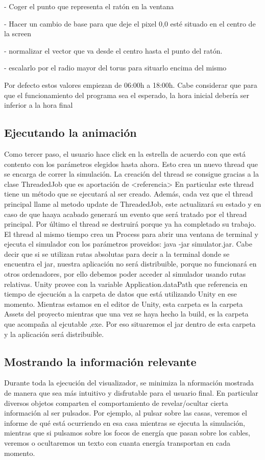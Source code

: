 \documentclass[12pt,a4paper,openright,oneside]{article}
\numberwithin{equation}{section}
\theoremstyle{definition}
\begin{document}
- Coger el punto que representa el ratón en la ventana

- Hacer un cambio de base para que deje el pixel 0,0 esté situado en el centro de la screen

- normalizar el vector que va desde el centro hasta el punto del ratón.

- escalarlo por el radio mayor del torus para situarlo encima del mismo

Por defecto estos valores empiezan de 06:00h a 18:00h. Cabe considerar que para que el funcionamiento del programa sea el esperado, la hora inicial debería ser inferior a la hora final


\subsection{Ejecutando la animación} 
Como tercer paso, el usuario hace click en la estrella de acuerdo con que está contento con los parámetros elegidos hasta ahora. Esto crea un nuevo thread que se encarga de correr la simulación. La creación del thread se consigue gracias a la clase ThreadedJob que es aportación de <referencia> En particular este thread tiene un método que se ejecutará al ser creado. Además, cada vez que el thread principal llame al metodo update de ThreadedJob, este actualizará su estado y en caso de que haaya acabado generará un evento que será tratado por el thread principal. Por último el thread se destruirá porque ya ha completado su trabajo.
El thread al mismo tiempo crea un Process para abrir una ventana de terminal y ejecuta el simulador con los parámetros proveidos: java -jar simulator.jar. Cabe decir que si se utilizan rutas absolutas para decir a la terminal donde se encuentra el jar, nuestra aplicación no será distribuible, porque no funcionará en otros ordenadores, por ello debemos poder acceder al simulador usando rutas relativas. Unity provee con la variable Application.dataPath que referencia en tiempo de ejecución a la carpeta de datos que está utilizando Unity en ese momento. Mientras estamos en el editor de Unity, esta carpeta es la carpeta Assets del proyecto mientras que una vez se haya hecho la build, es la carpeta que acompaña al ejcutable ,exe. Por eso situaremos el jar dentro de esta carpeta y la aplicación será distribuible.

\subsection{Mostrando la información relevante}
Durante toda la ejecución del visualizador, se minimiza la nformación mostrada de manera que sea más intuitivo y disfrutable para el usuario final. En particular diversos objetos comparten el comportamiento de revelar/ocultar cierta información al ser pulsados. Por ejemplo, al pulsar sobre las casas, veremos el informe de qué está ocurriendo en esa casa mientras se ejecuta la simulación, mientras que si pulsamos sobre los focos de energía que pasan sobre los cables, veremos o ocultaremos un texto con cuanta energía transportan en cada momento. 
\end{document}
